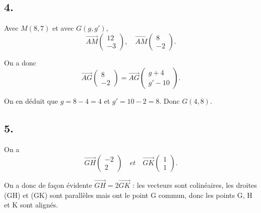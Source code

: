 	\subsection*{4.}
	
	Avec \(M(8, 7)\) et avec \(G(g, g')\),
	\[
	\overrightarrow{AM} \left( \begin{array}{c} 12 \\ -3 \end{array} \right), \quad \overrightarrow{AM} \left( \begin{array}{c} 8 \\ -2 \end{array} \right).
	\]
	
	On a donc
	\[
	\overrightarrow{AG} \left( \begin{array}{c} 8 \\ -2 \end{array} \right) = \overrightarrow{AG} \left( \begin{array}{c} g + 4 \\ g' - 10 \end{array} \right).
	\]
	
	On en déduit que \(g = 8 - 4 = 4\) et \(g' = 10 - 2 = 8\). Donc \(G(4, 8)\).
	
	\subsection*{5.}
	
	On a
	\[
	\overrightarrow{GH} \left( \begin{array}{c} -2 \\ 2 \end{array} \right) \quad et \quad \overrightarrow{GK} \left( \begin{array}{c} 1 \\ 1 \end{array} \right).
	\]
	
	On a donc de façon évidente \(\overrightarrow{GH} = 2 \overrightarrow{GK}\) : les vecteurs sont colinéaires, les droites (GH) et (GK) sont parallèles mais ont le point G commun, donc les points G, H et K sont alignés.
